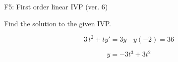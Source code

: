 \begin{exercise}
  \begin{exerciseTitle}F5: First order linear IVP (ver. 6)\end{exerciseTitle}
  \begin{exerciseStatement}
    
Find the solution to the given IVP.

    
\[3 \, t^{2} +ty'= 3 y \hspace{1em} y( -2 ) = 36\]

  \end{exerciseStatement}
  \begin{exerciseAnswer}
    
\[y= -3 t^ 3 +3 t^{2}\]

  \end{exerciseAnswer}
\end{exercise}